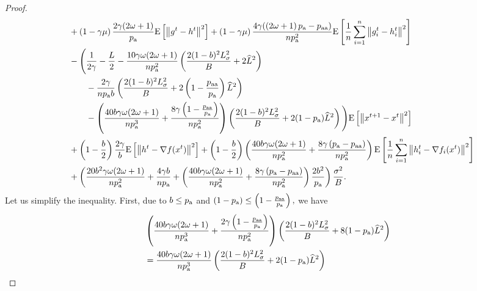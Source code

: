 \documentclass{article}
\newcommand*{\probavailable}{\ensuremath{p_{\textnormal{a}}}}
\newcommand*{\probpairaa}{\ensuremath{p_{\textnormal{aa}}}}
\begin{document}
\begin{proof}
\begin{align*}
        &\quad + \left(1 - \gamma \mu\right)\frac{2\gamma (2 \omega + 1)}{\probavailable} \Exp{\norm{g^{t} - h^{t}}^2} + \left(1 - \gamma \mu\right)\frac{4\gamma (\left(2 \omega + 1\right)\probavailable - \probpairaa)}{n \probavailable^2} \Exp{\frac{1}{n}\sum_{i=1}^n\norm{g^{t}_i - h^{t}_i}^2} \\
        &\quad - \Bigg(\frac{1}{2\gamma} - \frac{L}{2} - \frac{10 \gamma \omega (2 \omega + 1)}{n \probavailable^2} \left(\frac{2 (1 - b)^2 L_{\sigma}^2}{B} + 2 \widehat{L}^2\right) \\
        &\qquad\quad - \frac{2 \gamma}{n \probavailable b}\left(\frac{2 (1 - b)^2 L_{\sigma}^2}{B} + 2\left(1 - \frac{\probpairaa}{\probavailable}\right) \widehat{L}^2 \right) \\
        &\qquad\quad - \left(\frac{40 b \gamma \omega (2 \omega + 1)}{n \probavailable^3} + \frac{8 \gamma \left(1 - \frac{\probpairaa}{\probavailable}\right)}{n \probavailable^2}\right) \left(\frac{2 (1 - b)^2 L_{\sigma}^2}{B} + 2(1 - \probavailable) \widehat{L}^2\right)\Bigg) \Exp{\norm{x^{t+1} - x^t}^2} \\
        &\quad + \left(1 - \frac{b}{2}\right)\frac{2\gamma}{b} \Exp{\norm{h^{t} - \nabla f(x^{t})}^2} + \left(1 - \frac{b}{2}\right)\left(\frac{40 b \gamma \omega (2 \omega + 1)}{n \probavailable^2} + \frac{8 \gamma \left(\probavailable - \probpairaa\right)}{n \probavailable^2}\right)\Exp{\frac{1}{n}\sum_{i=1}^n\norm{h^{t}_i - \nabla f_i(x^{t})}^2} \\
        &\quad + \left(\frac{20 b^2 \gamma \omega (2 \omega + 1)}{n \probavailable^2} + \frac{4 \gamma b}{n \probavailable} + \left(\frac{40 b \gamma \omega (2 \omega + 1)}{n \probavailable^2} + \frac{8 \gamma \left(\probavailable - \probpairaa\right)}{n \probavailable^2}\right) \frac{2 b^2}{\probavailable}\right) \frac{\sigma^2}{B}.
      \end{align*}
      Let us simplify the inequality. First, due to $b \leq \probavailable$ and $\left(1 - \probavailable\right) \leq \left(1 - \frac{\probpairaa}{\probavailable}\right),$ we have
      \begin{align*}
        &\left(\frac{40 b \gamma \omega (2 \omega + 1)}{n \probavailable^3} + \frac{2 \gamma \left(1 - \frac{\probpairaa}{\probavailable}\right)}{n \probavailable^2}\right) \left(\frac{2 (1 - b)^2 L_{\sigma}^2}{B} + 8(1 - \probavailable) \widehat{L}^2\right) \\
        &=\frac{40 b \gamma \omega (2 \omega + 1)}{n \probavailable^3} \left(\frac{2 (1 - b)^2 L_{\sigma}^2}{B} + 2(1 - \probavailable) \widehat{L}^2\right) \\

\end{align*}
\end{proof}
\end{document}
